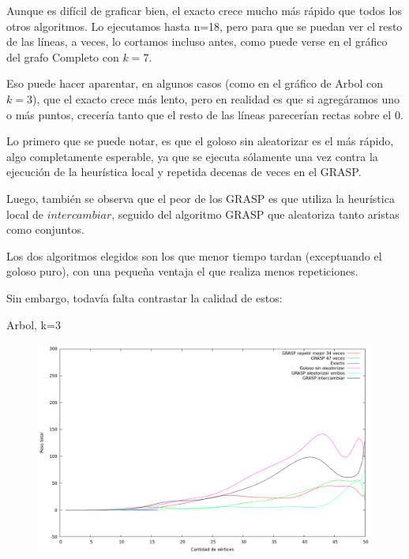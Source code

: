 \vspace*{0.5cm}

Aunque es difícil de graficar bien, el exacto crece mucho más rápido que todos
los otros algoritmos.
Lo ejecutamos hasta n=18, pero para que se puedan ver el resto de las líneas,
a veces, lo cortamos incluso antes, como puede verse en el gráfico del grafo
Completo con $k = 7$.

Eso puede hacer aparentar, en algunos casos (como en el gráfico de Arbol con
$k = 3$), que el exacto crece más lento, pero en realidad es que si agregáramos
uno o más puntos, crecería tanto que el resto de las líneas parecerían rectas
sobre el 0.

Lo primero que se puede notar, es que el goloso sin aleatorizar es el más
rápido, algo completamente esperable, ya que se ejecuta sólamente una vez contra
la ejecución de la heurística local y repetida decenas de veces en el GRASP.

Luego, también se observa que el peor de los GRASP es que utiliza la heurística
local de $intercambiar$, seguido del algoritmo GRASP que aleatoriza tanto
aristas como conjuntos.

Los dos algoritmos elegidos son los que menor tiempo tardan (exceptuando el
goloso puro), con una pequeña ventaja el que realiza menos repeticiones.

Sin embargo, todavía falta contrastar la calidad de estos:

Arbol, k=3
\vspace*{0.5cm}

\begin{figure}[h]
  \begin{center}
    \includegraphics[scale=0.35]{imagenes/ej6-arbol-k3-peso.png}
  \end{center}
\end{figure}


